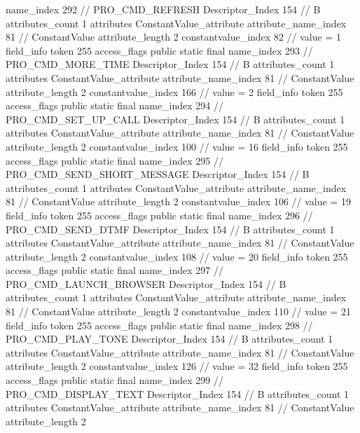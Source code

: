 {{{{{				name_index	292		// PRO_CMD_REFRESH
				Descriptor_Index	154		// B
				attributes_count	1
				attributes {
				ConstantValue_attribute {
					attribute_name_index	81		// ConstantValue
					attribute_length	2
					constantvalue_index	82		// value = 1
				}
				}
			}
			field_info {
				token	255
				access_flags	public static final
				name_index	293		// PRO_CMD_MORE_TIME
				Descriptor_Index	154		// B
				attributes_count	1
				attributes {
				ConstantValue_attribute {
					attribute_name_index	81		// ConstantValue
					attribute_length	2
					constantvalue_index	166		// value = 2
				}
				}
			}
			field_info {
				token	255
				access_flags	public static final
				name_index	294		// PRO_CMD_SET_UP_CALL
				Descriptor_Index	154		// B
				attributes_count	1
				attributes {
				ConstantValue_attribute {
					attribute_name_index	81		// ConstantValue
					attribute_length	2
					constantvalue_index	100		// value = 16
				}
				}
			}
			field_info {
				token	255
				access_flags	public static final
				name_index	295		// PRO_CMD_SEND_SHORT_MESSAGE
				Descriptor_Index	154		// B
				attributes_count	1
				attributes {
				ConstantValue_attribute {
					attribute_name_index	81		// ConstantValue
					attribute_length	2
					constantvalue_index	106		// value = 19
				}
				}
			}
			field_info {
				token	255
				access_flags	public static final
				name_index	296		// PRO_CMD_SEND_DTMF
				Descriptor_Index	154		// B
				attributes_count	1
				attributes {
				ConstantValue_attribute {
					attribute_name_index	81		// ConstantValue
					attribute_length	2
					constantvalue_index	108		// value = 20
				}
				}
			}
			field_info {
				token	255
				access_flags	public static final
				name_index	297		// PRO_CMD_LAUNCH_BROWSER
				Descriptor_Index	154		// B
				attributes_count	1
				attributes {
				ConstantValue_attribute {
					attribute_name_index	81		// ConstantValue
					attribute_length	2
					constantvalue_index	110		// value = 21
				}
				}
			}
			field_info {
				token	255
				access_flags	public static final
				name_index	298		// PRO_CMD_PLAY_TONE
				Descriptor_Index	154		// B
				attributes_count	1
				attributes {
				ConstantValue_attribute {
					attribute_name_index	81		// ConstantValue
					attribute_length	2
					constantvalue_index	126		// value = 32
				}
				}
			}
			field_info {
				token	255
				access_flags	public static final
				name_index	299		// PRO_CMD_DISPLAY_TEXT
				Descriptor_Index	154		// B
				attributes_count	1
				attributes {
				ConstantValue_attribute {
					attribute_name_index	81		// ConstantValue
					attribute_length	2
}}}}}}}
